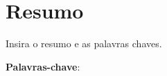 \chapter*{Resumo}
Insira o resumo e as palavras chaves.

\vspace{.5cm}
\textbf{Palavras-chave}:\palavraschaves



